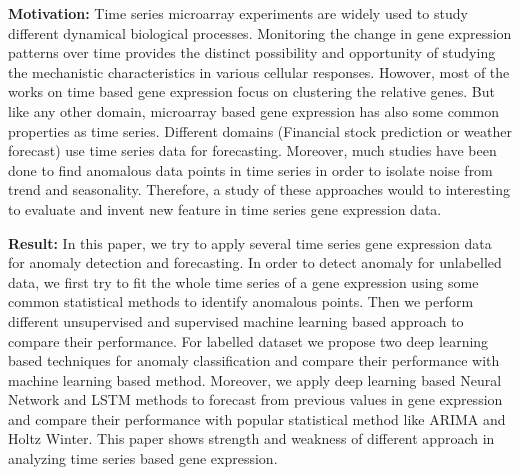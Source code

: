 \textbf{Motivation:}
Time series microarray experiments are widely used to study different dynamical biological processes. Monitoring the change in gene expression patterns over time provides the
distinct possibility and opportunity of studying the mechanistic characteristics in various cellular responses. 
Howover, most of the works on time based gene expression  focus on clustering the relative genes. But like any other domain, microarray based gene expression has also some common properties as time series. Different domains (Financial stock prediction or weather forecast) use time series data for forecasting. Moreover, much studies have been done to find anomalous data points in time series in order to isolate noise from trend and seasonality. Therefore, a study of these approaches would to interesting to evaluate and invent new feature in time series gene expression data.

\textbf{Result:}
In this paper, we try to apply several time series gene expression data for anomaly detection and forecasting. In order to detect  anomaly for unlabelled data, we first try to fit the whole time series of a gene expression using some common statistical methods to identify anomalous points. Then we perform different unsupervised and supervised machine learning based approach to compare their performance. For labelled dataset we propose two deep learning based techniques for anomaly classification and compare their performance with machine learning based method.
Moreover, we apply deep learning based Neural Network and LSTM methods to forecast from previous values in gene expression and compare their performance with popular statistical method like ARIMA and Holtz Winter. This paper shows strength and weakness of different approach in analyzing time series based gene expression.
